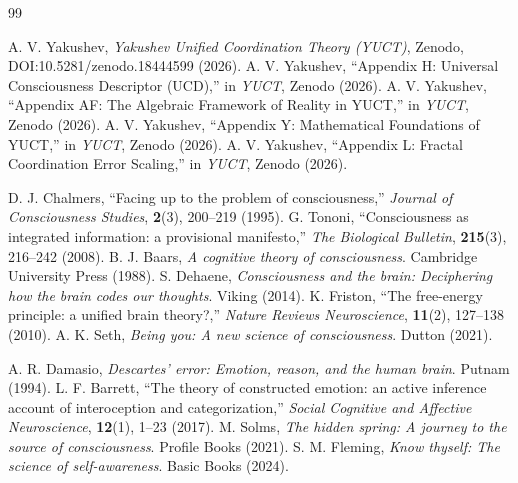 \documentclass[12pt,a4paper]{article}
\begin{document}
	\begin{thebibliography}{99}
		
		 A. V. Yakushev, \emph{Yakushev Unified Coordination Theory (YUCT)}, Zenodo, DOI:10.5281/zenodo.18444599 (2026).
		 A. V. Yakushev, ``Appendix H: Universal Consciousness Descriptor (UCD),'' in \emph{YUCT}, Zenodo (2026).
		 A. V. Yakushev, ``Appendix AF: The Algebraic Framework of Reality in YUCT,'' in \emph{YUCT}, Zenodo (2026).
		 A. V. Yakushev, ``Appendix Y: Mathematical Foundations of YUCT,'' in \emph{YUCT}, Zenodo (2026).
		 A. V. Yakushev, ``Appendix L: Fractal Coordination Error Scaling,'' in \emph{YUCT}, Zenodo (2026).
		
		 D. J. Chalmers, ``Facing up to the problem of consciousness,'' \emph{Journal of Consciousness Studies}, \textbf{2}(3), 200--219 (1995).
		 G. Tononi, ``Consciousness as integrated information: a provisional manifesto,'' \emph{The Biological Bulletin}, \textbf{215}(3), 216--242 (2008).
		 B. J. Baars, \emph{A cognitive theory of consciousness}. Cambridge University Press (1988).
		 S. Dehaene, \emph{Consciousness and the brain: Deciphering how the brain codes our thoughts}. Viking (2014).
		 K. Friston, ``The free-energy principle: a unified brain theory?,'' \emph{Nature Reviews Neuroscience}, \textbf{11}(2), 127--138 (2010).
		 A. K. Seth, \emph{Being you: A new science of consciousness}. Dutton (2021).
		
		 A. R. Damasio, \emph{Descartes' error: Emotion, reason, and the human brain}. Putnam (1994).
		 L. F. Barrett, ``The theory of constructed emotion: an active inference account of interoception and categorization,'' \emph{Social Cognitive and Affective Neuroscience}, \textbf{12}(1), 1--23 (2017).
		 M. Solms, \emph{The hidden spring: A journey to the source of consciousness}. Profile Books (2021).
		 S. M. Fleming, \emph{Know thyself: The science of self-awareness}. Basic Books (2024).
		

\end{thebibliography}
\end{document}
